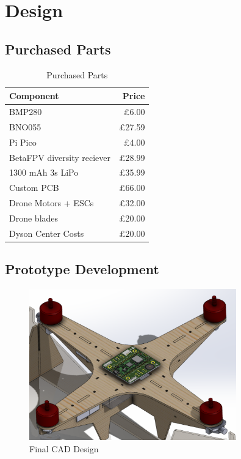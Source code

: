 \documentclass{article}
\begin{document}
\section{Design}

\subsection{Purchased Parts}

\begin{table}[H]
    \centering
    \begin{tabular}{|l|r|}
        \hline
        Component & Price \\
        \hline
        BMP280 & £6.00 \\
        BNO055 & £27.59 \\
        Pi Pico & £4.00 \\
        BetaFPV diversity reciever & £28.99 \\
        1300 mAh 3s LiPo & £35.99 \\
        Custom PCB & £66.00 \\
        Drone Motors + ESCs & £32.00 \\
        Drone blades & £20.00 \\
        Dyson Center Costs & £20.00 \\
        \hline
    \end{tabular}
    \caption{Purchased Parts}
\end{table}


\subsection{Prototype Development}

\begin{figure}[H]
    \centering
    \includegraphics[width=0.8\textwidth]{progress_cad.png}
    \caption{Final CAD Design}
\end{figure}
\end{document}
